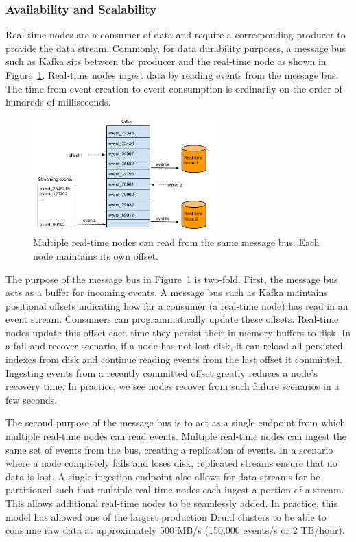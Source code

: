 \documentclass{sig-alternate-2013}
\begin{document}
\subsubsection{Availability and Scalability}
Real-time nodes are a consumer of data and require a corresponding producer to
provide the data stream.  Commonly, for data durability purposes, a message
bus such as Kafka \cite{kreps2011kafka} sits between the producer and the
real-time node as shown in Figure~\ref{fig:realtime_pipeline}. Real-time nodes
ingest data by reading events from the message bus. The time from event
creation to event consumption is ordinarily on the order of hundreds of
milliseconds.

\begin{figure}
\centering
\includegraphics[width = 2.8in]{realtime_pipeline}
\caption{Multiple real-time nodes can read from the same message bus. Each node maintains its own offset.}
\label{fig:realtime_pipeline}
\end{figure}

The purpose of the message bus in Figure~\ref{fig:realtime_pipeline} is
two-fold.  First, the message bus acts as a buffer for incoming events. A
message bus such as Kafka maintains positional offsets indicating how far a
consumer (a real-time node) has read in an event stream. Consumers can
programmatically update these offsets. Real-time nodes update this offset each
time they persist their in-memory buffers to disk. In a fail and recover
scenario, if a node has not lost disk, it can reload all persisted indexes from
disk and continue reading events from the last offset it committed. Ingesting
events from a recently committed offset greatly reduces a node's recovery time.
In practice, we see nodes recover from such failure scenarios in a
few seconds.

The second purpose of the message bus is to act as a single endpoint from which
multiple real-time nodes can read events. Multiple real-time nodes can ingest
the same set of events from the bus, creating a replication of events. In a
scenario where a node completely fails and loses disk, replicated streams
ensure that no data is lost. A single ingestion endpoint also allows for data
streams for be partitioned such that multiple real-time nodes each ingest a
portion of a stream. This allows additional real-time nodes to be seamlessly
added. In practice, this model has allowed one of the largest production Druid
clusters to be able to consume raw data at approximately 500 MB/s (150,000
events/s or 2 TB/hour).
\end{document}
